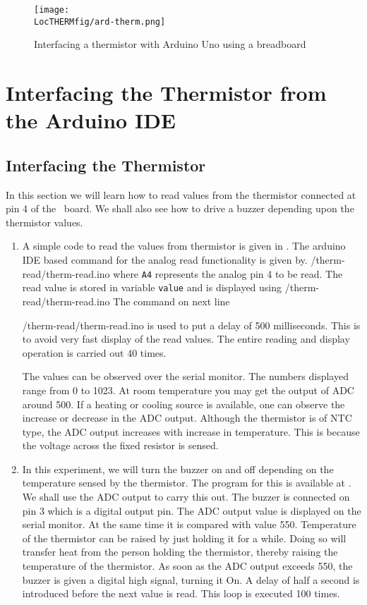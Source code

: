 \begin{figure}
  \centering
  \texttt{[image: \\LocTHERMfig/ard-therm.png]}
  \caption{Interfacing a thermistor with Arduino Uno using a breadboard}
  \label{fig:ard-therm-bread}
\end{figure}

\section{Interfacing the Thermistor from the Arduino IDE}
\subsection{Interfacing the Thermistor}
In this section we will learn how to read values from the thermistor
connected at pin 4 of the \arduino\ board. We shall also see how to
drive a buzzer depending upon the thermistor values.

\begin{enumerate}
\item A simple code to read the values from thermistor is given in . The arduino IDE based command for the analog read functionality is given by.
  {\LocTHERMardcode/therm-read/therm-read.ino} 
where {\tt A4} represents the analog pin 4 to be read. The read value is stored in variable {\tt value} and is displayed using   {\LocTHERMardcode/therm-read/therm-read.ino} 
The command on next line

  {\LocTHERMardcode/therm-read/therm-read.ino} 
 is used to put a delay of 500 milliseconds. This is to avoid very fast display of the read values. The entire reading and display operation is carried out 40 times.

The values can be observed over the serial monitor. The numbers
displayed range from 0 to 1023. At room temperature you may get the
output of ADC around 500. If a heating or cooling source is available,
one can observe the increase or decrease in the ADC output. Although
the thermistor is of NTC type, the ADC output increases with increase
in temperature. This is because the voltage across the fixed resistor
is sensed. 

\item In this experiment, we will turn the buzzer on and off depending
  on the temperature sensed by the thermistor. The program for this is
  available at . We shall use the ADC output
  to carry this out. The buzzer is connected on pin 3 which is a
  digital output pin. The ADC output value is displayed on the serial
  monitor. At the same time it is compared with value 550. Temperature
  of the thermistor can be raised by just holding it for a
  while. Doing so will transfer heat from the person holding the
  thermistor, thereby raising the temperature of the thermistor. As
  soon as the ADC output exceeds 550, the buzzer is given a digital
  high signal, turning it On. A delay of half a second is introduced
  before the next value is read. This loop is executed 100 times. 
\end{enumerate}

